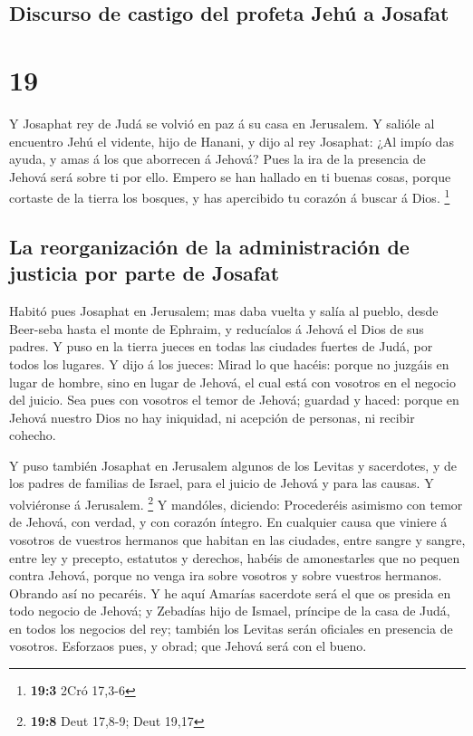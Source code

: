 \hypertarget{discurso-de-castigo-del-profeta-jehuxfa-a-josafat}{%
\subsection{Discurso de castigo del profeta Jehú a
Josafat}\label{discurso-de-castigo-del-profeta-jehuxfa-a-josafat}}

\hypertarget{section-18}{%
\section{19}\label{section-18}}

 Y Josaphat rey de Judá se volvió en paz á su casa en
Jerusalem.  Y salióle al encuentro Jehú el vidente, hijo
de Hanani, y dijo al rey Josaphat: ¿Al impío das ayuda, y amas á los que
aborrecen á Jehová? Pues la ira de la presencia de Jehová será sobre ti
por ello.  Empero se han hallado en ti buenas cosas,
porque cortaste de la tierra los bosques, y has apercibido tu corazón á
buscar á Dios. \footnote{\textbf{19:3} 2Cró 17,3-6}

\hypertarget{la-reorganizaciuxf3n-de-la-administraciuxf3n-de-justicia-por-parte-de-josafat}{%
\subsection{La reorganización de la administración de justicia por parte
de
Josafat}\label{la-reorganizaciuxf3n-de-la-administraciuxf3n-de-justicia-por-parte-de-josafat}}

 Habitó pues Josaphat en Jerusalem; mas daba vuelta y
salía al pueblo, desde Beer-seba hasta el monte de Ephraim, y reducíalos
á Jehová el Dios de sus padres.  Y puso en la tierra
jueces en todas las ciudades fuertes de Judá, por todos los lugares.
 Y dijo á los jueces: Mirad lo que hacéis: porque no
juzgáis en lugar de hombre, sino en lugar de Jehová, el cual está con
vosotros en el negocio del juicio.  Sea pues con vosotros
el temor de Jehová; guardad y haced: porque en Jehová nuestro Dios no
hay iniquidad, ni acepción de personas, ni recibir cohecho.

 Y puso también Josaphat en Jerusalem algunos de los
Levitas y sacerdotes, y de los padres de familias de Israel, para el
juicio de Jehová y para las causas. Y volviéronse á Jerusalem.
\footnote{\textbf{19:8} Deut 17,8-9; Deut 19,17}  Y
mandóles, diciendo: Procederéis asimismo con temor de Jehová, con
verdad, y con corazón íntegro.  En cualquier causa que
viniere á vosotros de vuestros hermanos que habitan en las ciudades,
entre sangre y sangre, entre ley y precepto, estatutos y derechos,
habéis de amonestarles que no pequen contra Jehová, porque no venga ira
sobre vosotros y sobre vuestros hermanos. Obrando así no pecaréis.
 Y he aquí Amarías sacerdote será el que os presida en
todo negocio de Jehová; y Zebadías hijo de Ismael, príncipe de la casa
de Judá, en todos los negocios del rey; también los Levitas serán
oficiales en presencia de vosotros. Esforzaos pues, y obrad; que Jehová
será con el bueno.


